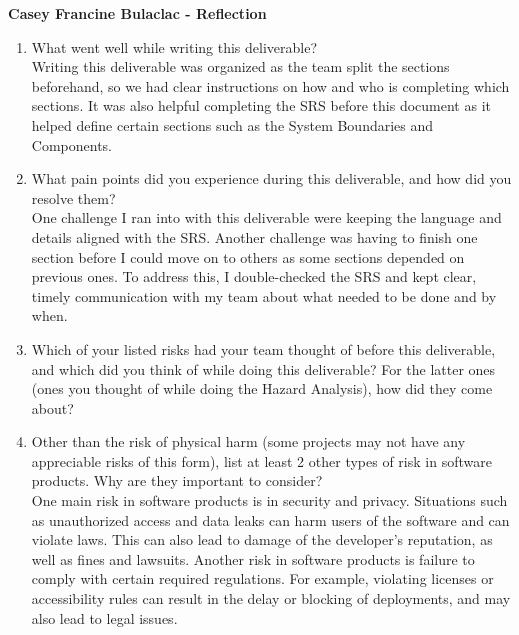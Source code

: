\documentclass{article}
\begin{document}
\textbf{Casey Francine Bulaclac - Reflection}
\begin{enumerate}
    \item What went well while writing this deliverable? \\[1ex]
    Writing this deliverable was organized as the team split the sections beforehand, so we had clear instructions on how and who is completing which sections. It 
    was also helpful completing the SRS before this document as it helped define certain sections such as the System Boundaries and Components. 
    \item What pain points did you experience during this deliverable, and how
    did you resolve them?\\[1ex]
    One challenge I ran into with this deliverable were keeping the language and details aligned with the SRS. Another challenge was having to finish one section before I could move on 
    to others as some sections depended on previous ones. To address this, I double-checked the SRS and kept clear, timely communication with my team about what needed to be done and by when.
    \item Which of your listed risks had your team thought of before this
    deliverable, and which did you think of while doing this deliverable? For
    the latter ones (ones you thought of while doing the Hazard Analysis), how
    did they come about? \\
    \item Other than the risk of physical harm (some projects may not have any
    appreciable risks of this form), list at least 2 other types of risk in
    software products. Why are they important to consider?\\[1ex]
    One main risk in software products is in security and privacy. Situations such as unauthorized access and data leaks can harm users of the software and 
    can violate laws. This can also lead to damage of the developer's reputation, as well as fines and lawsuits. Another risk in software products is failure to comply with 
    certain required regulations. For example, violating licenses or accessibility rules can result in the delay or blocking of deployments, and may also lead 
    to legal issues. 
\end{enumerate}
\end{document}
